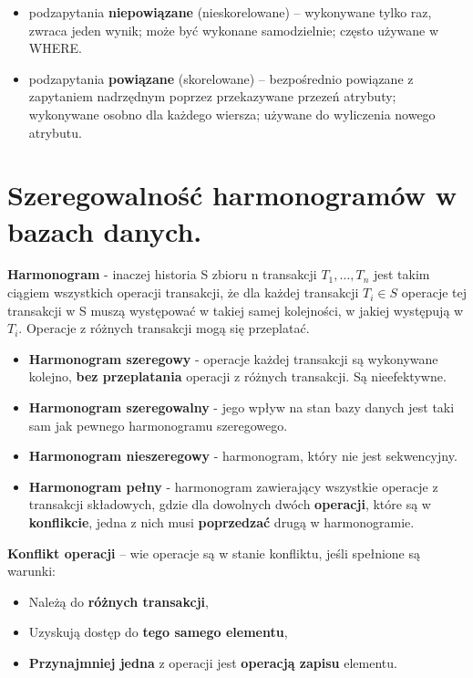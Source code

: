 \documentclass[main.tex]{subfiles}
\begin{document}
    \begin{itemize}
        \item podzapytania \textbf{niepowiązane} (nieskorelowane) -- wykonywane tylko raz, zwraca jeden wynik;
        może być wykonane samodzielnie; często używane w WHERE.
        \item podzapytania \textbf{powiązane} (skorelowane) -- bezpośrednio powiązane z zapytaniem nadrzędnym poprzez
        przekazywane przezeń atrybuty; wykonywane osobno dla każdego wiersza; używane do wyliczenia nowego atrybutu.
    \end{itemize}


    \section{Szeregowalność harmonogramów w bazach danych.}

    \textbf{Harmonogram} - inaczej historia S zbioru n transakcji $T_1, \dots, T_n$ jest takim ciągiem wszystkich
    operacji transakcji, że dla każdej transakcji $T_i \in S$ operacje tej transakcji w S muszą występować w takiej samej
    kolejności, w jakiej występują w $T_i$. Operacje z różnych transakcji mogą się przeplatać.

    \begin{itemize}[noitemsep]
        \item \textbf{Harmonogram szeregowy} - operacje każdej transakcji są wykonywane kolejno, \textbf{bez przeplatania}
        operacji z różnych transakcji. Są nieefektywne.
        \item \textbf{Harmonogram szeregowalny} - jego wpływ na stan bazy danych jest taki sam jak pewnego
        harmonogramu szeregowego.
        \item \textbf{Harmonogram nieszeregowy} - harmonogram, który nie jest sekwencyjny.
        \item \textbf{Harmonogram pełny} - harmonogram zawierający wszystkie operacje z transakcji składowych, gdzie dla
        dowolnych dwóch \textbf{operacji}, które są w \textbf{konflikcie}, jedna z nich musi \textbf{poprzedzać} drugą
        w harmonogramie.
    \end{itemize}

    \noindent \textbf{Konflikt operacji} -- wie operacje są w stanie konfliktu, jeśli spełnione są warunki:
    \begin{itemize}[noitemsep]
        \item Należą do \textbf{różnych transakcji},
        \item Uzyskują dostęp do \textbf{tego samego elementu},
        \item \textbf{Przynajmniej jedna} z operacji jest \textbf{operacją zapisu} elementu.
    \end{itemize}
\end{document}
